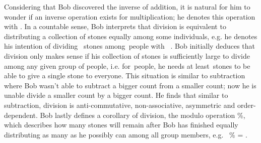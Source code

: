 \documentclass[a4paper,10pt]{article}
\newcommand{\three}{{\raisebox{-0.7ex}{\LARGE\starg{e}}}}
\newcommand{\four}{{\raisebox{-0.7ex}{\LARGE\starg{w}}}}
\newcommand{\six}{{\raisebox{-0.7ex}{\LARGE\starg{x}}}}
\newcommand{\seven}{{\raisebox{-0.7ex}{\LARGE\starg{t}}}}
\begin{document}
\begin{flushleft}
{{	Considering that Bob discovered the inverse of addition, it is natural for him to wonder if an inverse operation exists for multiplication; he denotes this operation with {\div}. In a countable sense, Bob interprets that {{division}} is equivalent to distributing a collection of stones equally among some individuals, e.g. he denotes his intention of dividing {\seven\,\three} stones among {\six\;\,}people with {\seven\,\three} {\div} {\six}. Bob initially deduces that division only makes sense if his collection of stones is sufficiently large to divide among any given group of people, i.e. for {\six\;\,}people, he needs at least {\six\;\,}stones to be able to give a single stone to everyone. This situation is similar to subtraction where Bob wasn't able to subtract a bigger count from a smaller count; now he is unable divide a smaller count by a bigger count. He finds that similar to subtraction, division is anti-commutative, non-associative, asymmetric and order-dependent. Bob lastly defines a corollary of division, the {{modulo}} operation {\%}, which describes how many stones will remain after Bob has finished equally distributing as many as he possibly can among all group members, e.g. {\seven\,\three} {\%} {\six} = {\four}. 
	\linebreak\linebreak
	}}
	\textbf{\Large{}}\linebreak\linebreak

\end{flushleft}
\end{document}
